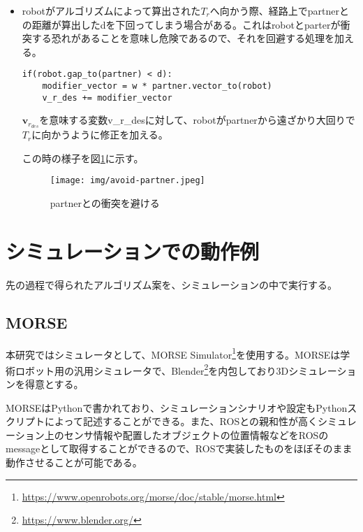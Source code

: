 \documentclass{kuisthesis}
\begin{document}
\begin{itemize}
\item robotがアルゴリズムによって算出された$T_r$へ向かう際、経路上でpartnerとの距離が算出したdを下回ってしまう場合がある。これはrobotとparterが衝突する恐れがあることを意味し危険であるので、それを回避する処理を加える。

\begin{lstlisting}
if(robot.gap_to(partner) < d):
	modifier_vector = w * partner.vector_to(robot)
	v_r_des += modifier_vector
\end{lstlisting}

$\bm{v}_r_{des}$を意味する変数v\_r\_desに対して、robotがpartnerから遠ざかり大回りで$T_r$に向かうように修正を加える。

この時の様子を図\ref{fig:avoid-partner}に示す。

\begin{figure}[h]\begin{center}
	\texttt{[image: img/avoid-partner.jpeg]}
	\caption{partnerとの衝突を避ける}
	\label{fig:avoid-partner}
\end{center}\end{figure}

\end{itemize}




\section{シミュレーションでの動作例}

先の過程で得られたアルゴリズム案を、シミュレーションの中で実行する。

\subsection{MORSE}

本研究ではシミュレータとして、MORSE Simulator\footnote{\url{https://www.openrobots.org/morse/doc/stable/morse.html}}を使用する。MORSEは学術ロボット用の汎用シミュレータで、Blender\footnote{\url{https://www.blender.org/}}を内包しており3Dシミュレーションを得意とする。

MORSEはPythonで書かれており、シミュレーションシナリオや設定もPythonスクリプトによって記述することができる。また、ROSとの親和性が高くシミュレーション上のセンサ情報や配置したオブジェクトの位置情報などをROSのmessageとして取得することができるので、ROSで実装したものをほぼそのまま動作させることが可能である。
\end{document}
